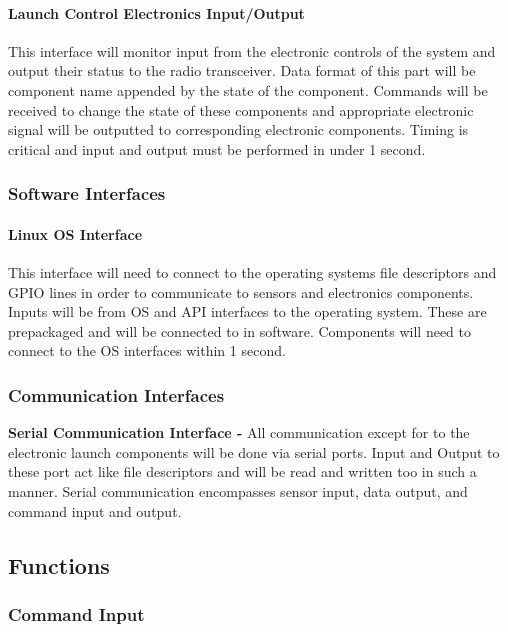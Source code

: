 \documentclass[10pt,draftclsnofoot,onecolumn,compsoc]{IEEEtran}
\begin{document}
\paragraph{\bf Launch Control Electronics Input/Output}
This interface will monitor input from the electronic controls of the system and output their status to the radio transceiver. Data format of this part will be component name appended by the state of the component. Commands will be received to change the state of these components and appropriate electronic signal will be outputted to corresponding electronic components. Timing is critical and input and output must be performed in under 1 second.


\subsubsection{Software Interfaces}
\paragraph{\bf Linux OS Interface} This interface will need to connect to the operating systems file descriptors and GPIO lines in order to communicate to sensors and electronics components. Inputs will be from OS and API interfaces to the operating system. These are prepackaged and will be connected to in software. Components will need to connect to the OS interfaces within 1 second. 

\subsubsection{Communication Interfaces}
{\bf Serial Communication Interface -} All communication except for to the electronic launch components will be done via serial ports. Input and Output to these port act like file descriptors and will be read and written too in such a manner. Serial communication encompasses sensor input, data output, and command input and output.

\subsection{Functions}
\subsubsection{Command Input}
\end{document}
